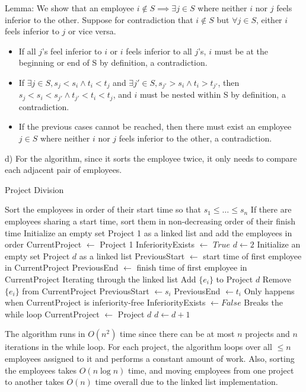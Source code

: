 \documentclass[11pt]{article}
\begin{document}
Lemma: We show that an employee $i\notin S \implies \exists j\in S$ where neither $i$ nor $j$ feels inferior to the other. Suppose for contradiction that $i\notin S$ but $\forall j\in S$, either $i$ feels inferior to $j$ or vice versa.

\begin{itemize}
    \item If all $j$'s feel inferior to $i$ or $i$ feels inferior to all $j$'s, $i$ must be at the beginning or end of S by definition, a contradiction.
    \item If $\exists j\in S, s_j<s_i \land t_i<t_j$ and $\exists j'\in S, s_{j'}>s_i \land t_i>t_{j'}$, then $s_j<s_i<s_{j'} \land t_{j'}<t_i<t_j$, and $i$ must be nested within S by definition, a contradiction.
    \item If the previous cases cannot be reached, then there must exist an employee $j\in S$ where neither $i$ nor $j$ feels inferior to the other, a contradiction.
\end{itemize}

d) For the algorithm, since it sorts the employee twice, it only needs to compare each adjacent pair of employees.

\begin{algorithm}[H]
\caption{Project Division}
\begin{algorithmic}[1]
\State Sort the employees in order of their start time so that $s_1 \leq \ldots \leq s_n$
\State If there are employees sharing a start time, sort them in non-decreasing order of their finish time
\State Initialize an empty set Project 1 as a linked list and add the employees in order
\State CurrentProject $\gets$ Project 1
\State InferiorityExists $\gets$ $True$
\State $d \gets 2$
\State Initialize an empty set Project $d$ as a linked list
\State PreviousStart $\gets$ start time of first employee in CurrentProject
\State PreviousEnd $\gets$ finish time of first employee in CurrentProject
 \Comment Iterating through the linked list
    \State Add $\{e_i\}$ to Project $d$
    \State Remove $\{e_i\}$ from CurrentProject
\Else
    \State PreviousStart $\gets s_{i}$
    \State PreviousEnd $\gets t_{i}$
\EndIf
\EndFor
{}
\Comment Only happens when CurrentProject is inferiority-free
\State InferiorityExists $\gets False$
\Comment Breaks the while loop
\Else
    \State CurrentProject $\gets$ Project $d$
    \State $d \gets d + 1$
\EndIf
\EndWhile
\end{algorithmic}
\end{algorithm}

The algorithm runs in $O(n^2)$ time since there can be at most $n$ projects and $n$ iterations in the while loop. For each project, the algorithm loops over all $\leq n$ employees assigned to it and performs a constant amount of work. Also, sorting the employees takes $O(n\log n)$ time, and moving employees from one project to another takes $O(n)$ time overall due to the linked list implementation.
\end{document}

